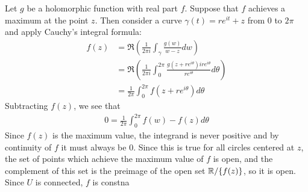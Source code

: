 \documentclass{homework}
\begin{document}
\begin{solution}
                                                                                        Let $g$ be a holomorphic function with real part $f$.
                                                                                        Suppose that $f$ achieves a maximum at the point $z$.
                                                                                        Then consider a curve $\gamma(t) = re^{it} + z$ from 0 to $2\pi$ and apply Cauchy's integral formula:
                                                                                        \begin{align*}
                                                                                        f(z) &= \Re\left(\frac{1}{2\pi i}\int_\gamma \frac{g(w)}{w-z}dw\right)\\
                                                                                        &= \Re\left(\frac{1}{2\pi i}\int_0^{2\pi} \frac{g(z + re^{i\theta})ire^{i\theta}}{re^{i\theta}}d\theta\right)\\
                                                                                        &= \frac{1}{2\pi }\int_0^{2\pi} f(z + re^{i\theta})d\theta
                                                                                        \end{align*}
                                                                                        Subtracting $f(z)$, we see that 
                                                                                        \begin{align*}
                                                                                        0 = \frac{1}{2\pi }\int_0^{2\pi} f(w) - f(z) d\theta
                                                                                        \end{align*}
                                                                                        Since $f(z)$ is the maximum value, the integrand is never positive and by continuity of $f$ it must always be 0. Since this is true for all circles centered at $z$, the set of points which achieve the maximum value of $f$ is open, and the complement of this set is the preimage of the open set $\mathbb{R}/\{f(z)\}$, so it is open. Since $U$ is connected, $f$ is constna
                                                                                        \end{solution}
\end{document}
